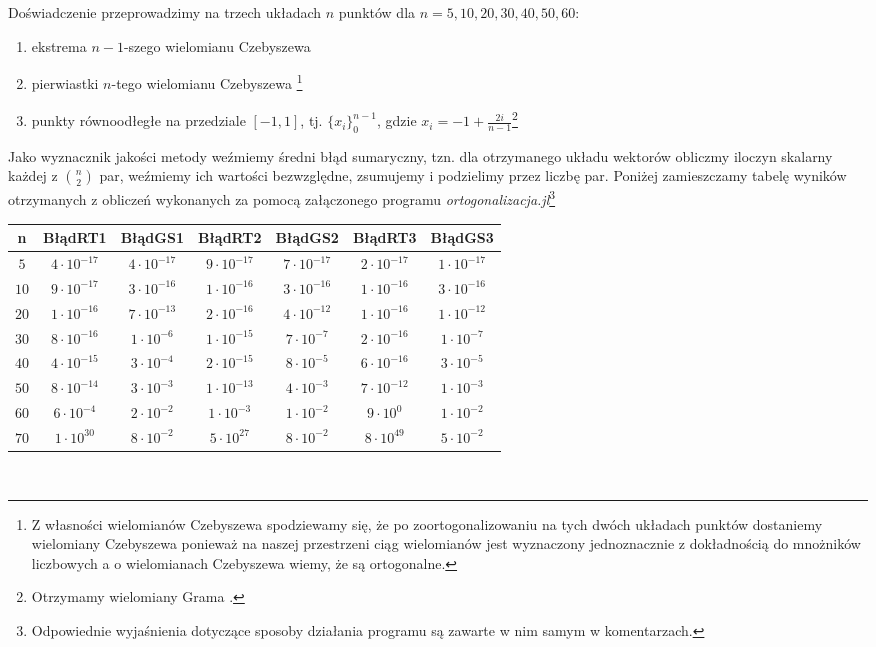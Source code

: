\documentclass[12pt,wide]{mwart}
\begin{document}
Doświadczenie przeprowadzimy na trzech układach $n$ punktów dla $n = 5,10,20,30,40,50,60$:
\begin{enumerate}
    \item ekstrema $n-1$-szego wielomianu Czebyszewa
    \item pierwiastki $n$-tego wielomianu Czebyszewa \footnote{Z własności wielomianów Czebyszewa spodziewamy się, że po zoortogonalizowaniu na tych dwóch układach punktów dostaniemy wielomiany Czebyszewa ponieważ na naszej przestrzeni ciąg wielomianów jest wyznaczony jednoznacznie z dokładnością do mnożników liczbowych a o wielomianach Czebyszewa wiemy, że są ortogonalne.}
    \item punkty równoodłegłe na przedziale $[-1,1]$, tj. $\{x_i\}_0^{n-1}$, gdzie $x_i = -1 + \frac{2i}{n-1}$\footnote{Otrzymamy wielomiany Grama \cite[strona 97]{JMJ}.}\\
\end{enumerate}    
Jako wyznacznik jakości metody weźmiemy średni błąd sumaryczny, tzn. dla otrzymanego układu wektorów obliczmy iloczyn skalarny każdej z ${n \choose 2}$ par, weźmiemy ich wartości bezwzględne, zsumujemy i podzielimy przez liczbę par. Poniżej zamieszczamy tabelę wyników otrzymanych z obliczeń wykonanych za pomocą załączonego programu \textit{ortogonalizacja.jl}\footnote{Odpowiednie wyjaśnienia dotyczące sposoby działania programu są zawarte w nim samym w komentarzach.}\\

 \begin{tabular}{|c|c|c|c|c|c|c|}
 \hline 
 n & BłądRT1 & BłądGS1 & BłądRT2 & BłądGS2 & BłądRT3 & BłądGS3 \\ 
 \hline 
 $5$ & $4\cdot 10^{-17}$ & $4\cdot 10^{-17}$ & $9\cdot 10^{-17}$ & $7\cdot 10^{-17}$ & $2\cdot 10^{-17}$ & $1\cdot 10^{-17}$ \\ 
 \hline 
 $10$ & $9\cdot 10^{-17}$ & $3\cdot 10^{-16}$ & $1\cdot 10^{-16}$ & $3\cdot 10^{-16}$ & $1\cdot 10^{-16}$ & $3\cdot 10^{-16}$ \\ 
 \hline 
 $20$ & $1\cdot 10^{-16}$ & $7\cdot 10^{-13}$ & $2\cdot 10^{-16}$ & $4\cdot 10^{-12}$ & $1\cdot 10^{-16}$ & $1\cdot 10^{-12}$ \\ 
 \hline 
 $30$ & $8\cdot 10^{-16}$ & $1\cdot 10^{-6}$ & $1\cdot 10^{-15}$ & $7\cdot 10^{-7}$ & $2\cdot 10^{-16}$ & $1\cdot 10^{-7}$ \\ 
 \hline 
 $40$ & $4\cdot 10^{-15}$ & $3\cdot 10^{-4}$ & $2\cdot 10^{-15}$ & $8\cdot 10^{-5}$ & $6\cdot 10^{-16}$ & $3\cdot 10^{-5}$ \\ 
 \hline 
 $50$ & $8\cdot 10^{-14}$ & $3\cdot 10^{-3}$ & $1\cdot 10^{-13}$ &$4\cdot 10^{-3}$ & $7\cdot 10^{-12}$ & $1\cdot 10^{-3}$ \\ 
 \hline 
 $60$ & $6\cdot 10^{-4}$ & $2\cdot 10^{-2}$ & $1\cdot 10^{-3}$ & $1\cdot 10^{-2}$ & $9\cdot 10^{0}$ & $1\cdot 10^{-2}$ \\ 
 \hline 
 $70$ & $1\cdot 10^{30}$ & $8\cdot 10^{-2}$ & $5\cdot 10^{27}$ & $8\cdot 10^{-2}$ & $8\cdot 10^{49}$ & $5\cdot 10^{-2}$ \\ 
 \hline 
 \end{tabular}\\
 
\end{document}
